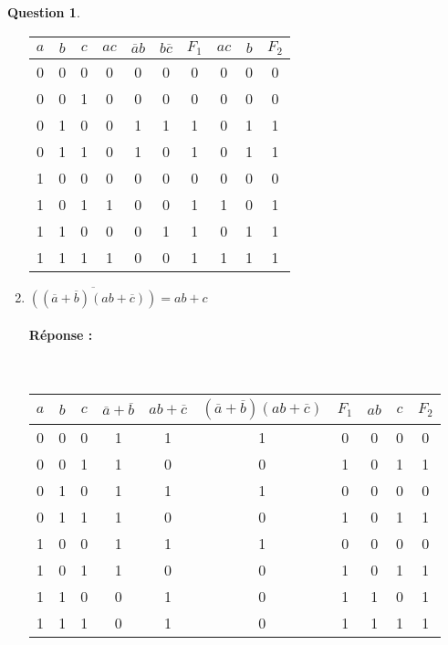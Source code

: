 \documentclass[11pt,a4paper]{article}
\theoremstyle{definition}%
\newtheorem{Q}{Question}[] %
\newcommand{\reponse}[1]{%
	\ifthenelse {\boolean{corrige}} {\paragraph{Réponse :} \color{darkblue}   #1\color{black}} {}
 }
\begin{document}
\begin{Q}
\begin{enumerate}
{		\renewcommand{\arraystretch}{1.3} %
		\begin{tabular}{|c|c|c|c|c|c|c|c|c|c|} \hline
		$a$ & $b$ & $c$ & $ac$ & $\overline{a}b$ & $b\overline{c}$ & $F_1$ & $ac$ & $b$ & $F_2$ \\ \hline
		0 & 0 & 0 & 0 & 0 & 0 & 0 & 0 & 0 & 0 \\ \hline
		0 & 0 & 1 & 0 & 0 & 0 & 0 & 0 & 0 & 0 \\ \hline
		0 & 1 & 0 & 0 & 1 & 1 & 1 & 0 & 1 & 1 \\ \hline
		0 & 1 & 1 & 0 & 1 & 0 & 1 & 0 & 1 & 1 \\ \hline
		1 & 0 & 0 & 0 & 0 & 0 & 0 & 0 & 0 & 0 \\ \hline
		1 & 0 & 1 & 1 & 0 & 0 & 1 & 1 & 0 & 1 \\ \hline
		1 & 1 & 0 & 0 & 0 & 1 & 1 & 0 & 1 & 1 \\ \hline
		1 & 1 & 1 & 1 & 0 & 0 & 1 & 1 & 1 & 1 \\ \hline
		\end{tabular}
	}

	\item $\overline{( (\overline{a}+\overline{b}) (ab+\overline{c}) )} = ab + c$
	\reponse{~\\

		\renewcommand{\arraystretch}{1.3} %
		\begin{tabular}{|c|c|c|c|c|c|c|c|c|c|} \hline
		$a$ & $b$ & $c$ & $\overline{a} + \overline{b}$ & $ab + \overline{c}$ & $(\overline{a}+\overline{b}) (ab+\overline{c})$ & $F_1$ & $ab$ & $c$ & $F_2$ \\ \hline
		0 & 0 & 0 & 1 & 1 & 1 & 0 & 0 & 0 & 0 \\ \hline
		0 & 0 & 1 & 1 & 0 & 0 & 1 & 0 & 1 & 1 \\ \hline
		0 & 1 & 0 & 1 & 1 & 1 & 0 & 0 & 0 & 0 \\ \hline
		0 & 1 & 1 & 1 & 0 & 0 & 1 & 0 & 1 & 1 \\ \hline
		1 & 0 & 0 & 1 & 1 & 1 & 0 & 0 & 0 & 0 \\ \hline
		1 & 0 & 1 & 1 & 0 & 0 & 1 & 0 & 1 & 1 \\ \hline
		1 & 1 & 0 & 0 & 1 & 0 & 1 & 1 & 0 & 1 \\ \hline
		1 & 1 & 1 & 0 & 1 & 0 & 1 & 1 & 1 & 1 \\ \hline
		\end{tabular}
	}
\end{enumerate}
\end{Q}
\end{document}
